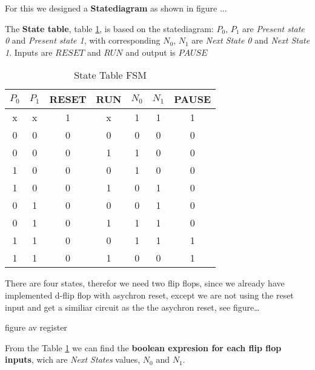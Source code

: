For this we designed a \textbf{Statediagram} as shown in figure ... 

The \textbf{State table}, table \ref{State Table FSM}, is based on the statediagram: $P_{0}$, $P_{1}$ are \emph{Present state 0} and \emph{Present state 1},  with corresponding $N_{0}$, $N_{1}$ are \emph{Next State 0} and \emph{Next State 1}. Inputs are $RESET$ and $RUN$ and output is $PAUSE$

\begin{table}[H]
    \centering
    \caption{State Table FSM}
    \label{State Table FSM}
    \begin{tabular}{|c|c|c|c|c|c|c|}
        \hline
        $P_{0}$ & $P_{1}$ & RESET & RUN & $N_{0}$ & $N_{1}$ & PAUSE \\
        \hline
        x    & x    & 1     & x   & 1    & 1    & 1     \\
        0    & 0    & 0     & 0   & 0    & 0    & 0     \\
        0    & 0    & 0     & 1   & 1    & 0    & 0     \\
        1    & 0    & 0     & 0   & 1    & 0    & 0     \\
        1    & 0    & 0     & 1   & 0    & 1    & 0     \\
        0    & 1    & 0     & 0   & 0    & 1    & 0     \\
        0    & 1    & 0     & 1   & 1    & 1    & 0     \\
        1    & 1    & 0     & 0   & 1    & 1    & 1     \\
        1    & 1    & 0     & 1   & 0    & 0    & 1     \\
        \hline
        
    \end{tabular}
    \end{table}

There are four states, therefor we need two flip flops, since we already have implemented d-flip flop with asychron reset, except we are not using the reset input and get a similiar circuit as the the asychron reset, see figure\dots

figure av register

From the Table \ref{State Table FSM} we can find the \textbf{boolean expresion for each flip flop inputs}, wich are \emph{Next States} values, $N_{0}$ and $N_{1}$. 

